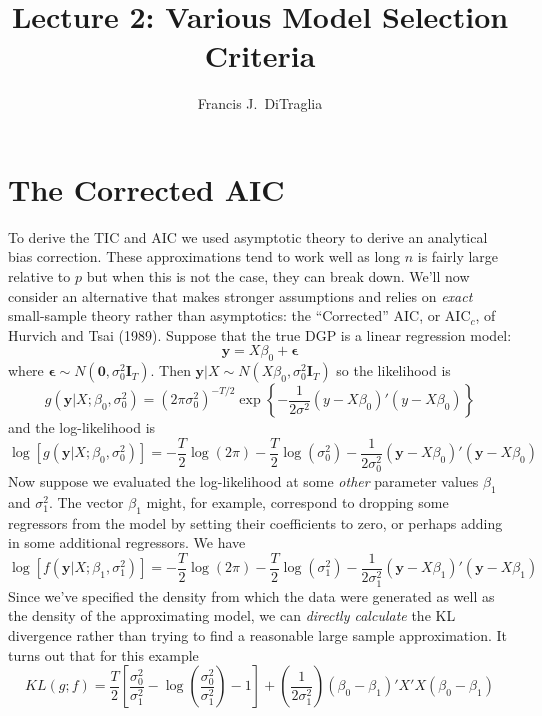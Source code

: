 \documentclass[12pt]{article}
\theoremstyle{definition}
\begin{document}
\title{Lecture 2: Various Model Selection Criteria}

\author{Francis J.\ DiTraglia}

\maketitle 


\section{The Corrected AIC}
To derive the TIC and AIC we used asymptotic theory to derive an analytical bias correction. These approximations tend to work well as long $n$ is fairly large relative to $p$ but when this is not the case, they can break down. We'll now consider an alternative that makes stronger assumptions and relies on \emph{exact} small-sample theory rather than asymptotics: the ``Corrected'' AIC, or AIC$
_c$, of Hurvich and Tsai (1989). Suppose that the true DGP is a linear regression model:
$$\textbf{y} = X\beta_0 + \boldsymbol{\epsilon}$$
where $\mathbf{\epsilon} \sim N(\mathbf{0}, \sigma_0^2 \mathbf{I}_T)$. Then $\mathbf{y}|X \sim N(X\beta_0, \sigma_0^2 \mathbf{I}_T)$ so the likelihood is
$$g(\textbf{y}|X;\beta_0, \sigma^2_0) = \left(2\pi\sigma_0^2\right)^{-T/2} \exp\left\{ -\frac{1}{2\sigma^2}(y - X\beta_0)'(y - X\beta_0)\right\}$$
and the log-likelihood is
$$\log\left[g(\textbf{y}|X;\beta_0, \sigma_0^2)\right] = -\frac{T}{2}\log(2\pi) -\frac{T}{2} \log(\sigma^2_0) - \frac{1}{2\sigma_0^2}\left(\textbf{y} - X\beta_0\right)'\left(\textbf{y} -X\beta_0\right)$$
Now suppose we evaluated the log-likelihood at some \emph{other} parameter values $\beta_1$ and $\sigma^2_1$. The vector $\beta_1$ might, for example, correspond to dropping some regressors from the model by setting their coefficients to zero, or perhaps adding in some additional regressors. We have
$$\log[f(\textbf{y}|X;\beta_1, \sigma_1^2)] = -\frac{T}{2}\log(2\pi) -\frac{T}{2} \log(\sigma^2_1) - \frac{1}{2\sigma_1^2}\left(\textbf{y} - X\beta_1\right)'\left(\textbf{y} -X\beta_1\right)$$
Since we've specified the density from which the data were generated as well as the density of the approximating model, we can \emph{directly calculate} the KL divergence rather than trying to find a reasonable large sample approximation. It turns out that for this example 
$$KL(g;f) = \frac{T}{2}\left[\frac{\sigma_0^2}{\sigma_1^2} - \log\left(\frac{\sigma_0^2}{\sigma_1^2}\right) - 1 \right] + \left(\frac{1}{2 \sigma_1^2}\right)\left(\beta_0 - \beta_1\right)'X'X\left(\beta_0 - \beta_1\right)$$
\end{document}
